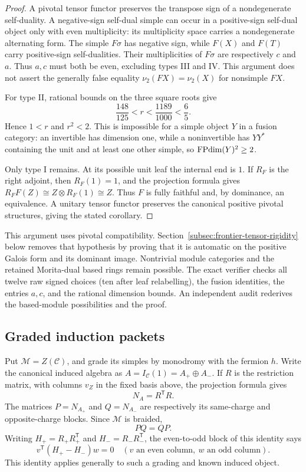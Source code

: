 \begin{proof}
A pivotal tensor functor preserves the transpose sign of a nondegenerate self-duality. A negative-sign self-dual simple can occur in a positive-sign self-dual object only with even multiplicity: its multiplicity space carries a nondegenerate alternating form. The simple $F\sigma$ has negative sign, while $F(X)$ and $F(T)$ carry positive-sign self-dualities. Their multiplicities of $F\sigma$ are respectively $c$ and $a$. Thus $a,c$ must both be even, excluding types III and IV. This argument does not assert the generally false equality $\nu_2(FX)=\nu_2(X)$ for nonsimple $FX$.

For type II, rational bounds on the three square roots give
\[
 \frac{148}{125}<r<\frac{1189}{1000}<\frac65.
\]
Hence $1<r$ and $r^2<2$. This is impossible for a simple object $Y$ in a fusion category: an invertible has dimension one, while a noninvertible has $YY^*$ containing the unit and at least one other simple, so $\operatorname{FPdim}(Y)^2\ge2$.

Only type I remains. At its possible unit leaf the internal end is $1$. If $R_F$ is the right adjoint, then $R_F(1)=1$, and the projection formula gives $R_FF(Z)\cong Z\otimes R_F(1)\cong Z$. Thus $F$ is fully faithful and, by dominance, an equivalence. A unitary tensor functor preserves the canonical positive pivotal structures, giving the stated corollary.
\end{proof}

This argument uses pivotal compatibility. Section~\ref{subsec:frontier-tensor-rigidity} below removes that hypothesis by proving that it is automatic on the positive Galois form and its dominant image. Nontrivial module categories and the retained Morita-dual based rings remain possible. The exact verifier checks all twelve raw signed choices (ten after leaf relabelling), the fusion identities, the entries $a,c$, and the rational dimension bounds. An independent audit rederives the based-module possibilities and the proof.

\subsection{Graded induction packets}
Put $\mathcal M=Z(\mathcal C)$, and grade its simples by monodromy with the fermion $h$. Write the canonical induced algebra as $A=I_{\mathcal C}(1)=A_+\oplus A_-$. If $R$ is the restriction matrix, with columns $v_Z$ in the fixed basis above, the projection formula gives
\[
 N_A=R^{\mathsf T}R.
\]
The matrices $P=N_{A_+}$ and $Q=N_{A_-}$ are respectively its same-charge and opposite-charge blocks. Since $\mathcal M$ is braided,
\begin{equation}\label{refined:eq:commute}
 PQ=QP.
\end{equation}
Writing $H_+=R_+R_+^{\mathsf T}$ and $H_-=R_-R_-^{\mathsf T}$, the even-to-odd block of this identity says
\begin{equation}\label{refined:eq:gramcommute}
 v^{\mathsf T}(H_+-H_-)w=0
 \quad(v\text{ an even column},\ w\text{ an odd column}).
\end{equation}
This identity applies generally to such a grading and known induced object.

